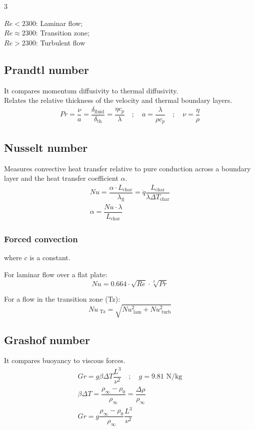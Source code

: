 \documentclass[9pt, landscape, a4paper]{article}
\begin{document}
\begin{multicols*}{3}
\begin{minipage}{0.5\linewidth}
  \centering
\end{minipage}%
\begin{minipage}{0.5\linewidth}
  $Re < 2300$: Laminar flow;\\
  $Re \approx 2300$: Transition zone;\\
  $Re > 2300$: Turbulent flow
\end{minipage}

\subsection{Prandtl number}
It compares momentum diffusivity to thermal diffusivity.\\
Relates the relative thickness of the velocity and thermal boundary layers.
\begin{gather*}
  Pr = \dfrac{\nu}{a} = \dfrac{\delta_\text{fluid}}{\delta_\text{th}} = \dfrac{\eta c_p}{\lambda}\quad ; \quad a = \dfrac{\lambda}{\rho c_p} \quad ; \quad \nu = \dfrac{\eta}{\rho}
\end{gather*}

\subsection{Nusselt number}
Measures convective heat transfer relative to pure conduction across a boundary layer
and the heat transfer coefficient $\alpha$.
\begin{gather*}
  Nu = \dfrac{\alpha\cdot L_\text{char}}{\lambda_\text{fl}} = \dot{q}\dfrac{L_\text{char}}{\lambda\Delta T_\text{char}}\\[.2cm]
  \alpha = \dfrac{Nu\cdot \lambda}{L_\text{char}}
\end{gather*}

\subsubsection{Forced convection}
where $c$ is a constant.

For laminar flow over a flat plate:
\[Nu = 0.664 \cdot \sqrt{Re} \cdot \sqrt[3]{Pr}\]

For a flow in the transition zone (Tz):
\[Nu_\text{ Tz} = \sqrt{Nu_{\text{ lam}}^2 + Nu_{\text{ turb}}^2}\]

\subsection{Grashof number}
It compares buoyancy to viscous forces.
\begin{gather*}
  Gr = g\beta\Delta T \dfrac{L^3}{\nu^2}\quad ; \quad g = 9.81 \text{ N/kg}\\
  \beta\Delta T = \dfrac{\rho_\infty - \rho_0}{\rho_\infty} = \dfrac{\Delta\rho}{\rho_\infty}\\
  Gr = g\dfrac{\rho_\infty - \rho_0}{\rho_\infty} \dfrac{L^3}{\nu^2}
\end{gather*}


\end{multicols*}
\end{document}
